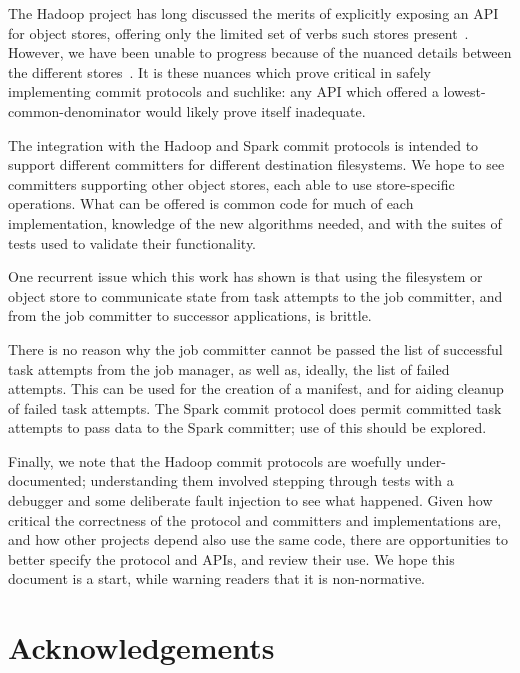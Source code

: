 \documentclass[format=acmsmall, screen=true, nonacm, timestamp, review=false]{acmart}
\begin{document}
The Hadoop project has long discussed the merits of explicitly
exposing an API for object stores, offering only the limited
set of verbs such stores present\ \cite{HADOOP-9565}.
However, we have been unable to progress because of the nuanced details
between the different stores\ \cite{S3, WASB, ADL, GCS}.
It is these nuances which prove critical in safely implementing
commit protocols and suchlike: any API which offered a lowest-common-denominator
would likely prove itself inadequate.

The integration with the Hadoop and Spark commit protocols is intended
to support different committers for different destination filesystems.
We hope to see committers supporting other object stores, each
able to use store-specific operations.
What can be offered is common code for much of each implementation,
knowledge of the new algorithms needed, and
with the suites of tests used to validate their functionality.

One recurrent issue which this work has shown is that using the
filesystem or object store to communicate state from task attempts
to the job committer, and from the job committer to successor
applications, is brittle.

There is no reason why the job committer cannot be passed the list of
successful task attempts from the job manager, as well as, ideally,
the list of failed attempts.
This can be used for the creation of a manifest, and for aiding cleanup
of failed task attempts.
The Spark commit protocol does permit committed task attempts to pass data
to the Spark committer;
use of this should be explored.


Finally, we note that the Hadoop commit protocols are woefully under-documented;
understanding them involved stepping through tests with a debugger and
some deliberate fault injection to see what happened.
Given how critical the correctness of the protocol and committers and implementations
are, and how other projects depend also use the same code, there
are opportunities to better specify the protocol and APIs, and review
their use.
We hope this document is a start, while warning readers that it is non-normative.


\section*{Acknowledgements}
\label{sec:acknowledgements}
\end{document}
